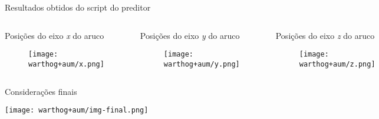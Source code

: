\begin{frame}[t]{Resultados obtidos do script do preditor} 

    \begin{columns}[t]
        \begin{center}
            Posições do eixo \textit{x} do aruco
            \begin{figure}
            \texttt{[image: warthog+aum/x.png]}
        \end{figure}
        \end{center}

        \begin{center}
            Posições do eixo \textit{y} do aruco
            \begin{figure}
                \texttt{[image: warthog+aum/y.png]}
            \end{figure}
        \end{center}

        \begin{center}
            Posições do eixo \textit{z} do aruco
            \begin{figure}
                \texttt{[image: warthog+aum/z.png]}
            \end{figure}
        \end{center}

    \end{columns}

\end{frame}
\begin{frame}[t]{Considerações finais} 

    
    \vspace*{0.3cm}
    \texttt{[image: warthog+aum/img-final.png]}
\end{frame}
